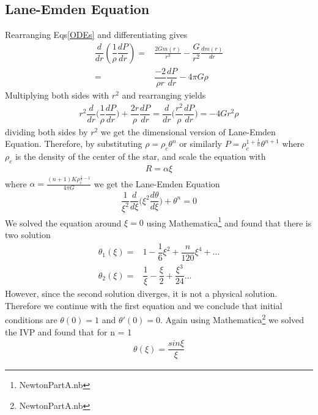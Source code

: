 \documentclass[aps,twocolumn,showpacs,preprintnumbers,nofootinbib,prl,superscriptaddress,groupedaddress]{revtex4-1}
\begin{document}
\subsection{Lane-Emden Equation}
Rearranging Eqs\ref{ODEs} and differentiating gives
\begin{align}
	\dfrac{d}{dr}(\dfrac{1}{\rho}\dfrac{dP}{dr}) =& \frac{2Gm(r)}{r^3} - \dfrac{G}{r^2}\frac{dm(r)}{dr}\nonumber\\
	=& \dfrac{-2}{\rho r}\dfrac{dP}{dr} - 4\pi G\rho\nonumber
\end{align}
Multiplying both sides with $r^2$ and rearranging  yields
\begin{align}
	r^2 \dfrac{d}{dr} \bigg(\dfrac{1}{\rho} \dfrac{dP}{dr}\bigg) + \dfrac{2r}{\rho} \dfrac{dP}{dr} = \dfrac{d}{dr}\bigg( \dfrac{r^2}{\rho}\dfrac{dP}{dr}\bigg) = -4Gr^2\rho\nonumber
\end{align}
dividing both sides by $ r^2 $ we get the dimensional version of Lane-Emden Equation. Therefore, by substituting $\rho = \rho_c \theta^n$ or similarly $P = \rho_c^{1 + \frac{1}{n}}\theta^{n+1}$ where $ \rho_c $ is the density of the center of the star, and scale the equation with
\begin{align}\label{R}
	R = \alpha\xi 
\end{align}
where $ \alpha = \frac{(n+1)K\rho_c^{\frac{1}{n} -1}}{4\pi G} $  we get the Lane-Emden Equation
\begin{align}\label{Lane}
	\dfrac{1}{\xi^2}\dfrac{d}{d\xi}\bigg(\xi^2 \dfrac{d\theta}{d\xi}\bigg) + \theta^n = 0
\end{align}
We solved the equation around $ \xi = 0 $ using Mathematica\footnote{NewtonPartA.nb} and found that there is two solution 
\begin{align}
	\theta_1(\xi) =& 1 - \dfrac{1}{6}\xi^2  + \dfrac{n}{120}\xi^4 + \dots\nonumber\\
	\theta_2(\xi) =& \dfrac{1}{\xi} - \dfrac{\xi}{2} + \dfrac{\xi^3}{24} \dots \nonumber
\end{align}
However, since the second solution diverges, it is not a physical solution. Therefore we continue with the first equation and we conclude that initial conditions are $ \theta(0) = 1$ and $ \theta'(0) = 0$. Again using Mathematica\footnote{NewtonPartA.nb} we solved the IVP and found that for n = 1
\begin{align}
	\theta(\xi) = \dfrac{sin\xi}{\xi} \nonumber
\end{align}
\end{document}
